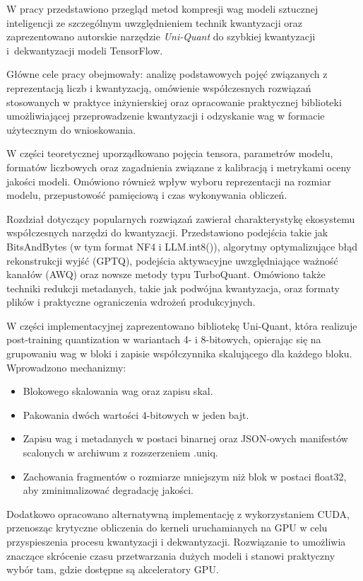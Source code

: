 W pracy przedstawiono przegląd metod kompresji wag modeli sztucznej inteligencji ze szczególnym uwzględnieniem technik kwantyzacji oraz zaprezentowano autorskie narzędzie \textit{Uni-Quant} do szybkiej kwantyzacji i~dekwantyzacji modeli TensorFlow.

Główne cele pracy obejmowały: analizę podstawowych pojęć związanych z reprezentacją liczb i kwantyzacją, omówienie współczesnych rozwiązań stosowanych w praktyce inżynierskiej oraz opracowanie praktycznej biblioteki umożliwiającej przeprowadzenie kwantyzacji i odzyskanie wag w formacie użytecznym do wnioskowania.

W części teoretycznej uporządkowano pojęcia tensora, parametrów modelu, formatów liczbowych oraz zagadnienia związane z kalibracją i metrykami oceny jakości modeli. Omówiono również wpływ wyboru reprezentacji na rozmiar modelu, przepustowość pamięciową i czas wykonywania obliczeń.

Rozdział dotyczący popularnych rozwiązań zawierał charakterystykę ekosystemu współczesnych narzędzi do kwantyzacji. Przedstawiono podejścia takie jak BitsAndBytes (w tym format NF4 i LLM.int8()), algorytmy optymalizujące błąd rekonstrukcji wyjść (GPTQ), podejścia aktywacyjne uwzględniające ważność kanałów (AWQ) oraz nowsze metody typu TurboQuant. Omówiono także techniki redukcji metadanych, takie jak podwójna kwantyzacja, oraz formaty plików i praktyczne ograniczenia wdrożeń produkcyjnych.

W części implementacyjnej zaprezentowano bibliotekę Uni-Quant, która realizuje post-training quantization w wariantach 4- i 8-bitowych, opierając się na grupowaniu wag w bloki i zapisie współczynnika skalującego dla każdego bloku. Wprowadzono mechanizmy:
\begin{itemize}
    \item Blokowego skalowania wag oraz zapisu skal.
    \item Pakowania dwóch wartości 4-bitowych w jeden bajt.
    \item Zapisu wag i metadanych w postaci binarnej oraz JSON-owych manifestów scalonych w archiwum z rozszerzeniem .uniq.
    \item Zachowania fragmentów o rozmiarze mniejszym niż blok w postaci float32, aby zminimalizować degradację jakości.
\end{itemize}

Dodatkowo opracowano alternatywną implementację z wykorzystaniem CUDA, przenosząc krytyczne obliczenia do kerneli uruchamianych na GPU w celu przyspieszenia procesu kwantyzacji i dekwantyzacji. Rozwiązanie to umożliwia znaczące skrócenie czasu przetwarzania dużych modeli i stanowi praktyczny wybór tam, gdzie dostępne są akceleratory GPU.

